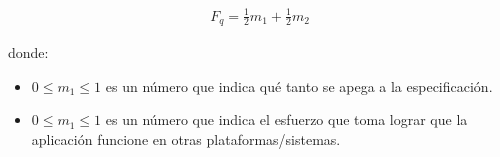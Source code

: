 \begin{align*}
  F_q = \frac{1}{2}m_1 + \frac{1}{2}m_2
\end{align*}

donde:

\begin{itemize}
\item $0 \leq m_1 \leq 1$ es un número que indica qué tanto se apega a la especificación.

\item $0 \leq m_1 \leq 1$ es un número que indica el esfuerzo que toma lograr que la aplicación funcione en otras plataformas/sistemas.
\end{itemize}


